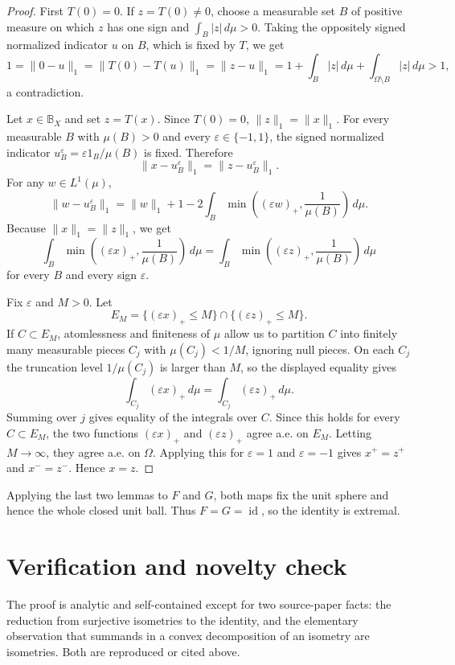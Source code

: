 \documentclass[11pt]{article}
\newcommand{\B}{\mathbb{B}}
\newcommand{\id}{\operatorname{id}}
\begin{document}
\begin{proof}
First \(T(0)=0\). If \(z=T(0)\ne0\), choose a measurable set \(B\) of positive
measure on which \(z\) has one sign and \(\int_B |z|\,d\mu>0\). Taking the
oppositely signed normalized indicator \(u\) on \(B\), which is fixed by \(T\),
we get
\[
   1=\|0-u\|_1=\|T(0)-T(u)\|_1=\|z-u\|_1=1+\int_B|z|\,d\mu+\int_{\Omega\setminus B}|z|\,d\mu>1,
\]
a contradiction.

Let \(x\in\B_X\) and set \(z=T(x)\). Since \(T(0)=0\), \(\|z\|_1=\|x\|_1\).
For every measurable \(B\) with \(\mu(B)>0\) and every
\(\varepsilon\in\{-1,1\}\), the signed normalized indicator
\(u_B^\varepsilon=\varepsilon1_B/\mu(B)\) is fixed. Therefore
\[
   \|x-u_B^\varepsilon\|_1=\|z-u_B^\varepsilon\|_1 .
\]
For any \(w\in L^1(\mu)\),
\[
   \|w-u_B^\varepsilon\|_1
   =\|w\|_1+1-2\int_B
      \min\left((\varepsilon w)_+,\frac1{\mu(B)}\right)\,d\mu .
\]
Because \(\|x\|_1=\|z\|_1\), we get
\[
   \int_B \min\left((\varepsilon x)_+,\frac1{\mu(B)}\right)\,d\mu
   =
   \int_B \min\left((\varepsilon z)_+,\frac1{\mu(B)}\right)\,d\mu
\]
for every \(B\) and every sign \(\varepsilon\).

Fix \(\varepsilon\) and \(M>0\). Let
\[
   E_M=\{(\varepsilon x)_+\le M\}\cap\{(\varepsilon z)_+\le M\}.
\]
If \(C\subset E_M\), atomlessness and finiteness of \(\mu\) allow us to
partition \(C\) into finitely many measurable pieces \(C_j\) with
\(\mu(C_j)<1/M\), ignoring null pieces. On each \(C_j\) the truncation level
\(1/\mu(C_j)\) is larger than \(M\), so the displayed equality gives
\[
   \int_{C_j}(\varepsilon x)_+\,d\mu
   =
   \int_{C_j}(\varepsilon z)_+\,d\mu .
\]
Summing over \(j\) gives equality of the integrals over \(C\). Since this holds
for every \(C\subset E_M\), the two functions \((\varepsilon x)_+\) and
\((\varepsilon z)_+\) agree a.e. on \(E_M\). Letting \(M\to\infty\), they
agree a.e. on \(\Omega\). Applying this for \(\varepsilon=1\) and
\(\varepsilon=-1\) gives \(x^+=z^+\) and \(x^-=z^-\). Hence \(x=z\).
\end{proof}

Applying the last two lemmas to \(F\) and \(G\), both maps fix the unit sphere
and hence the whole closed unit ball. Thus \(F=G=\id\), so the identity is
extremal.

\section*{Verification and novelty check}

The proof is analytic and self-contained except for two source-paper facts:
the reduction from surjective isometries to the identity, and the elementary
observation that summands in a convex decomposition of an isometry are
isometries. Both are reproduced or cited above.
\end{document}
